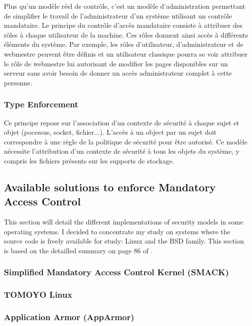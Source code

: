 \documentclass[pdftex,a4paper,titlepage,11pt]{article}
\begin{document}
Plus qu'un modèle réel de contrôle, c'est un modèle d'administration permettant
de simplifier le travail de l'administrateur d'un système utilisant un contrôle
mandataire. Le principe du contrôle d'accès mandataire consiste à attribuer des
rôles à chaque utilisateur de la machine. Ces rôles donnent ainsi accès à
différents éléments du système. Par exemple, les rôles d'utilisateur,
d'administrateur et de webmestre peuvent être définis et un utilisateur
classique pourra se voir attribuer le rôle de webmestre lui autorisant de
modifier les pages disponibles sur un serveur sans avoir besoin de donner un
accès administrateur complet à cette personne.

\subsubsection{Type Enforcement}

Ce principe repose sur l'association d'un contexte de sécurité à chaque sujet et
objet (pocessus, socket, fichier...). L'accès à un object par un sujet doit
correspondre à une règle de la politique de sécurité pour être autorisé. Ce
modèle nécessite l'attribution d'un contexte de sécurité à tous les objets du
système, y compris les fichiers présents sur les supports de stockage.

\subsection{Available solutions to enforce Mandatory Access Control}

This section will detail the different implementations of security models in
some operating systems. I decided to concentrate my study on systems where the
source code is freely available for study: Linux and the BSD family. This
section is based on the detailled summary on page 86 of
\cite{theseJBriffaut}.

\subsubsection{Simplified Mandatory Access Control Kernel (SMACK)}

\subsubsection{TOMOYO Linux}

\subsubsection{Application Armor (AppArmor)}
\end{document}

